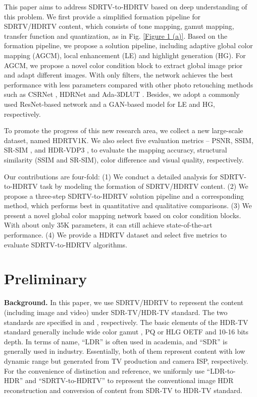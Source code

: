 \documentclass[10pt,twocolumn,letterpaper]{article}
\begin{document}
This paper aims to address SDRTV-to-HDRTV based on deep understanding of this problem. We first provide a simplified formation pipeline for SDRTV/HDRTV content, which consists of tone mapping, gamut mapping, transfer function and quantization, as in Fig. \ref{Figure 1 (a)}. Based on the formation pipeline, we propose a solution pipeline, including adaptive global color mapping (AGCM), local enhancement (LE) and highlight generation (HG). For AGCM, we propose a novel color condition block to extract global image prior and adapt different images. With only  filters, the network achieves the best performance with less parameters compared with other photo retouching methods such as CSRNet \cite{he2020conditional}, HDRNet \cite{gharbi2017deep} and Ada-3DLUT \cite{zeng2020learning}. Besides, we adopt a commonly used ResNet-based network and a GAN-based model for LE and HG, respectively.

To promote the progress of this new research area, we collect a new large-scale dataset, named HDRTV1K. We also select five evaluation metrics -- PSNR, SSIM, SR-SIM \cite{zhang2012sr},  \cite{ITP} and HDR-VDP3 \cite{mantiuk2011hdr}, to evaluate the mapping accuracy, structural similarity (SSIM and SR-SIM), color difference and visual quality, respectively.

Our contributions are four-fold: (1) We conduct a detailed analysis for SDRTV-to-HDRTV task by modeling the formation of SDRTV/HDRTV content. (2) We propose a three-step SDRTV-to-HDRTV solution pipeline and a corresponding method, which performs best in quantitative and qualitative comparisons. (3) We present a novel global color mapping network based on color condition blocks. With about only 35K parameters, it can still achieve state-of-the-art performance. (4) We provide a HDRTV dataset and select five metrics to evaluate SDRTV-to-HDRTV algorithms.

\vspace{-3pt}
\section{Preliminary}
\label{Preliminary}
\textbf{Background.} In this paper, we use SDRTV/HDRTV to represent the content (including image and video) under SDR-TV/HDR-TV standard. The two standards are specified in \cite{rec709, BT1886} and \cite{rec2020, bt2100}, respectively. The basic elements of the HDR-TV standard generally include wide color gamut \cite{rec2020}, PQ or HLG OETF \cite{bt2100} and 10-16 bits depth. In terms of name, ``LDR'' is often used in academia, and ``SDR'' is generally used in industry. Essentially, both of them represent content with low dynamic range but generated from TV production and camera ISP, respectively. For the convenience of distinction and reference, we uniformly use ``LDR-to-HDR'' and ``SDRTV-to-HDRTV'' to represent the conventional image HDR reconstruction and conversion of content from SDR-TV to HDR-TV standard.
\end{document}
